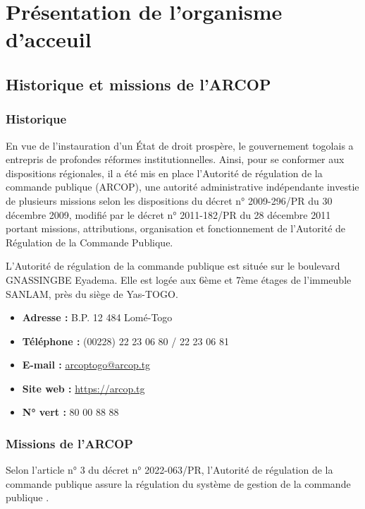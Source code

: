 \chapter{Présentation de l'organisme d'acceuil}
\clearpage
\section{Historique et missions de l’ARCOP}

\subsection{Historique}
En vue de l’instauration d’un État de droit prospère, le gouvernement togolais a entrepris de profondes réformes institutionnelles. Ainsi, pour se conformer aux dispositions régionales, il a été mis en place l’Autorité de régulation de la commande publique (ARCOP), une autorité administrative indépendante investie de plusieurs missions selon les dispositions du décret n° 2009-296/PR du 30 décembre 2009, modifié par le décret n° 2011-182/PR du 28 décembre 2011 portant missions, attributions, organisation et fonctionnement de l’Autorité de Régulation de la Commande Publique.

L’Autorité de régulation de la commande publique est située sur le boulevard GNASSINGBE Eyadema. Elle est logée aux 6ème et 7ème étages de l’immeuble SANLAM, près du siège de Yas-TOGO.

\begin{itemize}
    \item \textbf{Adresse :} B.P. 12 484 Lomé-Togo
    \item \textbf{Téléphone :} (00228) 22 23 06 80 / 22 23 06 81
    \item \textbf{E-mail :} \href{arcoptogo@arcop.tg}{arcoptogo@arcop.tg}
    \item \textbf{Site web :} \href{https://arcop.tg}{https://arcop.tg}
    \item \textbf{N° vert :} 80 00 88 88
\end{itemize}

\subsection{Missions de l’ARCOP}
Selon l’article n° 3 du décret n° 2022-063/PR, \og l’Autorité de régulation de la commande publique assure la régulation du système de gestion de la commande publique \fg.

